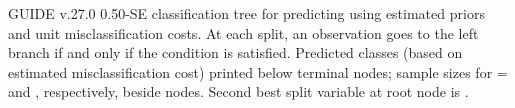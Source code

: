 \documentclass{article}
\begin{document}
 GUIDE v.27.0
0.50-SE classification tree for predicting \texttt{} using
 estimated priors
 and unit misclassification costs.
At each split, an observation goes to the left branch 
 if and only if the condition is satisfied.
Predicted classes (based on estimated misclassification cost)
printed below terminal nodes;
 sample sizes for \texttt{} =
 \texttt{} and \texttt{}, respectively, beside nodes.
Second best split variable at root node is \texttt{}.
 
\end{document}
